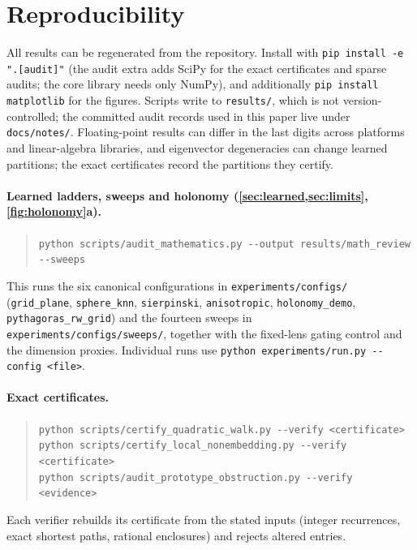 \documentclass[11pt]{article}
\begin{document}
 \section{Reproducibility}
\label{app:reproducibility}

All results can be regenerated from the repository.
Install with \texttt{pip install -e ".[audit]"} (the audit extra adds SciPy for the exact certificates and sparse audits; the core library needs only NumPy), and additionally \texttt{pip install matplotlib} for the figures.
Scripts write to \texttt{results/}, which is not version-controlled; the committed audit records used in this paper live under \texttt{docs/notes/}.
Floating-point results can differ in the last digits across platforms and linear-algebra libraries, and eigenvector degeneracies can change learned partitions; the exact certificates record the partitions they certify.

\paragraph{Learned ladders, sweeps and holonomy (\cref{sec:learned,sec:limits}, \cref{fig:holonomy}a).}
\begin{quote}\small
\texttt{python scripts/audit\_mathematics.py -{}-output results/math\_review -{}-sweeps}
\end{quote}
This runs the six canonical configurations in \texttt{experiments/configs/} (\texttt{grid\_plane}, \texttt{sphere\_knn}, \texttt{sierpinski}, \texttt{anisotropic}, \texttt{holonomy\_demo}, \texttt{pythagoras\_rw\_grid}) and the fourteen sweeps in \texttt{experiments/configs/sweeps/}, together with the fixed-lens gating control and the dimension proxies.
Individual runs use \texttt{python experiments/run.py -{}-config <file>}.

\paragraph{Exact certificates.}
\begin{quote}\small
\texttt{python scripts/certify\_quadratic\_walk.py -{}-verify <certificate>}\\
\texttt{python scripts/certify\_local\_nonembedding.py -{}-verify <certificate>}\\
\texttt{python scripts/audit\_prototype\_obstruction.py -{}-verify <evidence>}
\end{quote}
Each verifier rebuilds its certificate from the stated inputs (integer recurrences, exact shortest paths, rational enclosures) and rejects altered entries.
\end{document}
